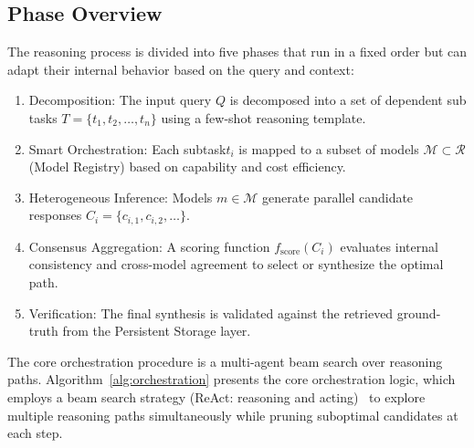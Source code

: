 \documentclass{iopjournal}
\begin{document}
\subsection{Phase Overview}

The reasoning process is divided into five phases that run in a fixed order but can adapt their internal behavior based on the query and context:

\begin{enumerate}
    \item Decomposition: The input query $Q$ is decomposed into a set of dependent sub tasks $T = \{t_1, t_2, \ldots, t_n\}$ using a few-shot reasoning template.
    \item Smart Orchestration: Each subtask$t_i$ is mapped to a subset of models $\mathcal{M} \subset \mathcal{R}$ (Model Registry) based on capability and cost efficiency.
    \item Heterogeneous Inference: Models $m \in \mathcal{M}$ generate parallel candidate responses $C_i = \{c_{i,1}, c_{i,2}, \ldots\}$.
    \item Consensus Aggregation: A scoring function $f_{\text{score}}(C_i)$ evaluates internal consistency and cross-model agreement to select or synthesize the optimal path.
    \item Verification: The final synthesis is validated against the retrieved ground-truth from the Persistent Storage layer.
\end{enumerate}

The core orchestration procedure is a multi-agent beam search over reasoning paths. Algorithm~\ref{alg:orchestration} presents the core orchestration logic, which employs a beam search strategy (ReAct: reasoning and acting)~\cite{ReAct} to explore multiple reasoning paths simultaneously while pruning suboptimal candidates at each step.
\end{document}
